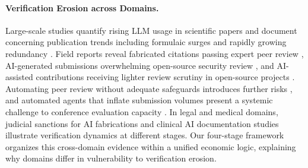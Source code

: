 \documentclass{article}
\theoremstyle{plain}
\theoremstyle{definition}
\theoremstyle{remark}
\begin{document}
\paragraph{Verification Erosion across Domains.}
Large-scale studies quantify rising LLM usage in scientific papers \citep{liang-etal-2025-quantifying} and document concerning publication trends including formulaic surges \citep{suchak-etal-2025-explosion} and rapidly growing redundancy \citep{maupin-etal-2025-dramatic}. Field reports reveal fabricated citations passing expert peer review \citep{esau-etal-2025-gptzero}, AI-generated submissions overwhelming open-source security review \citep{stenberg2025deathslops}, and AI-assisted contributions receiving lighter review scrutiny in open-source projects \citep{gao2026autopilot}. Automating peer review without adequate safeguards introduces further risks \citep{baumann2026stopautomatingpeerreview}, and automated agents that inflate submission volumes present a systemic challenge to conference evaluation capacity \citep{shan2026positionacademicconferencespotentially}. In legal and medical domains, judicial sanctions for AI fabrications \citep{mata2023sanctions, baylson2023aiorder} and clinical AI documentation studies \citep{zaretsky2024discharge, small2025hospitalcourse, song2025eddischarge} illustrate verification dynamics at different stages. Our four-stage framework organizes this cross-domain evidence within a unified economic logic, explaining why domains differ in vulnerability to verification erosion.
\end{document}
